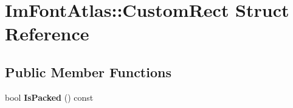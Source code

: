 \hypertarget{struct_im_font_atlas_1_1_custom_rect}{}\section{Im\+Font\+Atlas\+:\+:Custom\+Rect Struct Reference}
\label{struct_im_font_atlas_1_1_custom_rect}
\subsection*{Public Member Functions}
\begin{DoxyCompactItemize}
\item 
\mbox{\label{struct_im_font_atlas_1_1_custom_rect_ac15602342c8eabbddf559bc84a3e6700}} 
bool {\bfseries Is\+Packed} () const
\end{DoxyCompactItemize}
